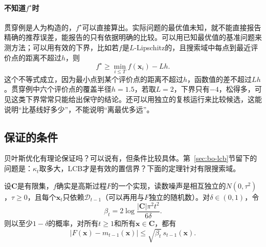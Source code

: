 \paragraph{不知道$f^\star$时}
贯穿例是人为构造的，$f^\star$可以直接算出。实际问题的最优值未知，就不能直接报告精确的推荐误差，能报告的只有依据明确的比较。可以用已知最优值的基准问题来测方法；可以用有效的下界，比如若$f$是$L$-Lipschitz的，且搜索域中每点到最近评价点的距离不超过$h$，则
\begin{equation}
 f^\star\geq\min_{i\leq T}f(\bm{x}_i)-Lh.
 \label{eq:bo-lipschitz-bound}
\end{equation}
这个不等式成立，因为最小点到某个评价点的距离不超过$h$，函数值的差不超过$Lh$。贯穿例中六个评价点的覆盖半径$h=1.5$，若取$L=2$，下界只有$-4$，松得多，可见这类下界常常只能给出保守的结论。还可以用独立的复核运行来比较候选，这能说明“比基线好多少”，不能说明“离最优多远”。

\subsection{保证的条件}
\label{sec:bo-guarantees}

贝叶斯优化有理论保证吗？可以说有，但条件比较具体。第~\ref{sec:bo-lcb}节留下的问题是：$\kappa_t$取多大，LCB才是有效的置信界？下面的定理针对有限搜索域。

\begin{theorem}[有限搜索域上的同时置信界]
\label{thm:bo-confidence}
设$\bm{C}$是有限集，$f$确实是高斯过程$F$的一个实现，读数噪声是相互独立的$N(0,\tau^2)$，$\tau\geq0$，且每个$\bm{x}_t$只依赖$\mathcal{D}_{t-1}$（可以再用与$F$独立的随机数）。对$\delta\in(0,1)$，令
\begin{equation}
 \beta_t=2\log\frac{\lvert\bm{C}\rvert\pi^2t^2}{6\delta}.
 \label{eq:bo-beta}
\end{equation}
则以至少$1-\delta$的概率，对所有$t\geq1$和所有$\bm{x}\in\bm{C}$，都有
\begin{equation}
 \lvert F(\bm{x})-m_{t-1}(\bm{x})\rvert\leq\sqrt{\beta_t}\,s_{t-1}(\bm{x}).
 \label{eq:bo-confidence}
\end{equation}
\end{theorem}

